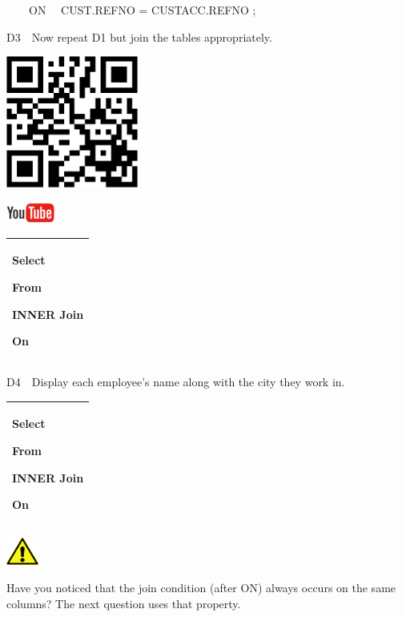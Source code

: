 \ \ \ \ ON \ \ CUST.REFNO = CUSTACC.REFNO ;

D3\ \ Now repeat D1 but join the tables appropriately.



\begin{center}
\begin{minipage}{4.849cm}
   
\includegraphics[width=4.341cm,height=4.341cm]{images/img (37).png}
 

   
\includegraphics[width=1.582cm,height=0.674cm]{images/img (15).png}
 
\end{minipage}
\end{center}
\begin{flushleft}
\tablefirsthead{}
\tablehead{}
\tabletail{}
\tablelasttail{}
\begin{supertabular}{|m{11.329cm}|}
\hline
Select

From

INNER Join

On\\\hline
\end{supertabular}
\end{flushleft}
D4\ \ Display each employee's name along with the city they work in.

\begin{flushleft}
\tablefirsthead{}
\tablehead{}
\tabletail{}
\tablelasttail{}
\begin{supertabular}{|m{11.361cm}|}
\hline
Select

From

INNER Join

On

\\\hline
\end{supertabular}
\end{flushleft}


\begin{center}
  
\includegraphics[width=1.06cm,height=0.903cm]{images/img (2).png}

\end{center}
Have you noticed that the join condition (after ON) always occurs on the same columns? The next question uses that property.

